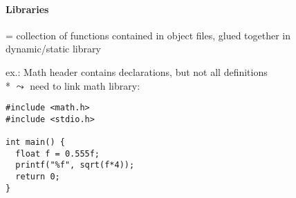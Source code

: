 \paragraph{Libraries}
\begin{items}
  \item = collection of functions contained in object files, glued together in dynamic/static library
  \item ex.: Math header contains declarations, but not all definitions \\*
    \( \leadsto \) need to link math library: 
\end{items}
\begin{lstlisting}[style=customc]
#include <math.h>
#include <stdio.h>

int main() {
  float f = 0.555f;
  printf("%f", sqrt(f*4));
  return 0;
}
\end{lstlisting}